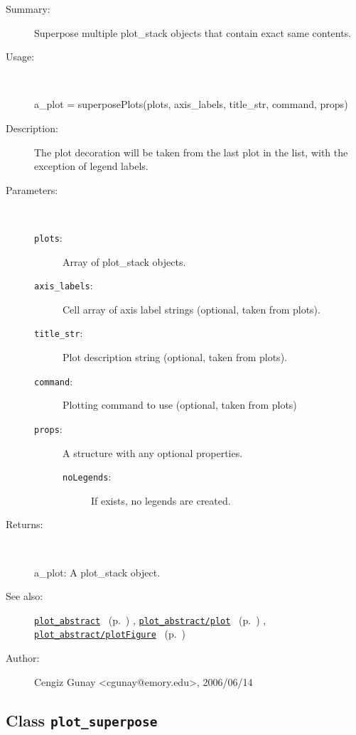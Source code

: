 \begin{description}
\item[Summary:]Superpose multiple plot\_stack objects that contain exact same contents.
%
\item[Usage:]~%
\begin{lyxcode}%
a\_plot = superposePlots(plots, axis\_labels, title\_str, command, props)
%
\end{lyxcode}%
%
\item[Description:]%
The plot decoration will be taken from the last plot in the list, 
 with the exception of legend labels.
\item[Parameters:]~
\begin{description}%
\item[\texttt{plots}:]
 Array of plot\_stack objects.
\item[\texttt{axis\_labels}:]
 Cell array of axis label strings (optional, taken from plots).
\item[\texttt{title\_str}:]
 Plot description string (optional, taken from plots).
\item[\texttt{command}:]
 Plotting command to use (optional, taken from plots)
\item[\texttt{props}:]
 A structure with any optional properties.
\begin{description}%
\item[\texttt{noLegends}:]
 If exists, no legends are created.
\end{description}%
\end{description}%
%
\item[Returns:
]~

	a\_plot: A plot\_stack object.
%
%
\item[See also:]%
\hyperlink{ref_plot_abstract}{\texttt{plot\_abstract}}%
\ (p.~\pageref{ref_plot_abstract})%
%
, \hyperlink{ref_plot_abstract__plot}{\texttt{plot\_abstract/plot}}%
\ (p.~\pageref{ref_plot_abstract__plot})%
%
, \hyperlink{ref_plot_abstract__plotFigure}{\texttt{plot\_abstract/plotFigure}}%
\ (p.~\pageref{ref_plot_abstract__plotFigure})%
%
%
\item[Author:]%
Cengiz Gunay <cgunay@emory.edu>, 2006/06/14
%
\end{description}
\methodline%
\subsection{Class \texttt{plot\_superpose}}%
%
\label{ref_plot_superpose}%
\hypertarget{ref_plot_superpose}{}%
